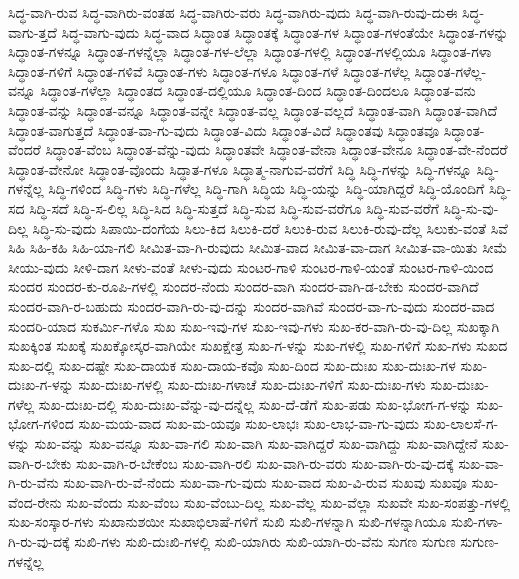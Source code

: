 {ಸಿದ್ಧ-ವಾಗಿ-ರುವ
ಸಿದ್ಧ-ವಾಗಿರು-ವಂತಹ
ಸಿದ್ಧ-ವಾಗಿರು-ವರು
ಸಿದ್ಧ-ವಾಗಿರು-ವುದು
ಸಿದ್ಧ-ವಾಗಿ-ರುವು-ದುಈ
ಸಿದ್ಧ-ವಾಗು-ತ್ತದೆ
ಸಿದ್ಧ-ವಾಗು-ವುದು
ಸಿದ್ಧ-ವಾದ
ಸಿದ್ಧಾಂತ
ಸಿದ್ಧಾಂತಕ್ಕೆ
ಸಿದ್ಧಾಂತ-ಗಳ
ಸಿದ್ಧಾಂತ-ಗಳಂತೆಯೇ
ಸಿದ್ಧಾಂತ-ಗಳನ್ನು
ಸಿದ್ಧಾಂತ-ಗಳನ್ನೂ
ಸಿದ್ಧಾಂತ-ಗಳನ್ನೆಲ್ಲಾ
ಸಿದ್ಧಾಂತ-ಗಳ-ಲೆಲ್ಲಾ
ಸಿದ್ಧಾಂತ-ಗಳಲ್ಲಿ
ಸಿದ್ಧಾಂತ-ಗಳಲ್ಲಿಯೂ
ಸಿದ್ಧಾಂತ-ಗಳಾ
ಸಿದ್ಧಾಂತ-ಗಳಿಗೆ
ಸಿದ್ಧಾಂತ-ಗಳಿವೆ
ಸಿದ್ಧಾಂತ-ಗಳು
ಸಿದ್ಧಾಂತ-ಗಳೂ
ಸಿದ್ಧಾಂತ-ಗಳೆ
ಸಿದ್ಧಾಂತ-ಗಳೆಲ್ಲ
ಸಿದ್ಧಾಂತ-ಗಳೆಲ್ಲ-ವನ್ನೂ
ಸಿದ್ಧಾಂತ-ಗಳೆಲ್ಲಾ
ಸಿದ್ಧಾಂತದ
ಸಿದ್ಧಾಂತ-ದಲ್ಲಿಯೂ
ಸಿದ್ಧಾಂತ-ದಿಂದ
ಸಿದ್ಧಾಂತ-ದಿಂದಲೂ
ಸಿದ್ಧಾಂತ-ವನು
ಸಿದ್ಧಾಂತ-ವನ್ನು
ಸಿದ್ಧಾಂತ-ವನ್ನೂ
ಸಿದ್ಧಾಂತ-ವನ್ನೇ
ಸಿದ್ಧಾಂತ-ವಲ್ಲ
ಸಿದ್ಧಾಂತ-ವಲ್ಲದೆ
ಸಿದ್ಧಾಂತ-ವಾಗಿ
ಸಿದ್ಧಾಂತ-ವಾಗಿದೆ
ಸಿದ್ಧಾಂತ-ವಾಗುತ್ತದೆ
ಸಿದ್ಧಾಂತ-ವಾ-ಗು-ವುದು
ಸಿದ್ಧಾಂತ-ವಿದು
ಸಿದ್ಧಾಂತ-ವಿದೆ
ಸಿದ್ಧಾಂತವು
ಸಿದ್ಧಾಂತವೂ
ಸಿದ್ಧಾಂತ-ವೆಂದರೆ
ಸಿದ್ಧಾಂತ-ವೆಂಬ
ಸಿದ್ಧಾಂತ-ವೆನ್ನು-ವುದು
ಸಿದ್ಧಾಂತವೇ
ಸಿದ್ಧಾಂತ-ವೇನಾ
ಸಿದ್ಧಾಂತ-ವೇನೂ
ಸಿದ್ಧಾಂತ-ವೇ-ನೆಂದರೆ
ಸಿದ್ಧಾಂತ-ವೇನೋ
ಸಿದ್ಧಾಂತ-ವೊಂದು
ಸಿದ್ಧಾತ-ಗಳೂ
ಸಿದ್ಧಾತ್ಮ-ನಾಗುವ-ವರೆಗೆ
ಸಿದ್ಧಿ
ಸಿದ್ಧಿ-ಗಳನ್ನು
ಸಿದ್ಧಿ-ಗಳನ್ನೂ
ಸಿದ್ಧಿ-ಗಳನ್ನೆಲ್ಲ
ಸಿದ್ಧಿ-ಗಳಿಂದ
ಸಿದ್ಧಿ-ಗಳು
ಸಿದ್ಧಿ-ಗಳೆಲ್ಲ
ಸಿದ್ಧಿ-ಗಾಗಿ
ಸಿದ್ಧಿಯ
ಸಿದ್ಧಿ-ಯನ್ನು
ಸಿದ್ಧಿ-ಯಾಗಿದ್ದರೆ
ಸಿದ್ಧಿ-ಯೊಂದಿಗೆ
ಸಿದ್ಧಿ-ಸದ
ಸಿದ್ಧಿ-ಸದೆ
ಸಿದ್ಧಿ-ಸ-ಲಿಲ್ಲ
ಸಿದ್ಧಿ-ಸಿದ
ಸಿದ್ಧಿ-ಸುತ್ತದೆ
ಸಿದ್ಧಿ-ಸುವ
ಸಿದ್ಧಿ-ಸುವ-ವರೆಗೂ
ಸಿದ್ಧಿ-ಸುವ-ವರೆಗೆ
ಸಿದ್ಧಿ-ಸು-ವು-ದಿಲ್ಲ
ಸಿದ್ಧಿ-ಸು-ವುದು
ಸಿಪಾಯಿ-ದಂಗೆಯ
ಸಿಲು-ಕಿದ
ಸಿಲುಕಿ-ದರೆ
ಸಿಲುಕಿ-ರುವ
ಸಿಲುಕಿ-ರುವು-ದೆಲ್ಲ
ಸಿಲುಕು-ವಂತೆ
ಸಿವೆ
ಸಿಹಿ
ಸಿಹಿ-ಕಹಿ
ಸಿಹಿ-ಯಾ-ಗಲಿ
ಸೀಮಿತ-ವಾ-ಗಿ-ರುವುದು
ಸೀಮಿತ-ವಾದ
ಸೀಮಿತ-ವಾ-ದಾಗ
ಸೀಮಿತ-ವಾ-ಯಿತು
ಸೀಮೆ
ಸೀಯು-ವುದು
ಸೀಳಿ-ದಾಗ
ಸೀಳು-ವಂತೆ
ಸೀಳು-ವುದು
ಸುಂಟರ-ಗಾಳಿ
ಸುಂಟರ-ಗಾಳಿ-ಯಂತೆ
ಸುಂಟರ-ಗಾಳಿ-ಯಿಂದ
ಸುಂದರ
ಸುಂದರ-ಕು-ರೂಪಿ-ಗಳಲ್ಲಿ
ಸುಂದರ-ನೆಂದು
ಸುಂದರ-ವಾಗಿ
ಸುಂದರ-ವಾಗಿ-ಡ-ಬೇಕು
ಸುಂದರ-ವಾಗಿದೆ
ಸುಂದರ-ವಾಗಿ-ರ-ಬಹುದು
ಸುಂದರ-ವಾಗಿ-ರು-ವು-ದನ್ನು
ಸುಂದರ-ವಾಗಿವೆ
ಸುಂದರ-ವಾ-ಗು-ವುದು
ಸುಂದರ-ವಾದ
ಸುಂದರಿ-ಯಾದ
ಸುಕರ್ಮಿ-ಗಳೊ
ಸುಖ
ಸುಖ-ಇವು-ಗಳ
ಸುಖ-ಇವು-ಗಳು
ಸುಖ-ಕರ-ವಾಗಿ-ರು-ವು-ದಿಲ್ಲ
ಸುಖಕ್ಕಾಗಿ
ಸುಖಕ್ಕಿಂತ
ಸುಖಕ್ಕೆ
ಸುಖಕ್ಕೋಸ್ಕರ-ವಾಗಿಯೇ
ಸುಖಕ್ಷೇತ್ರ
ಸುಖ-ಗ-ಳನ್ನು
ಸುಖ-ಗಳಲ್ಲಿ
ಸುಖ-ಗಳಿಗೆ
ಸುಖ-ಗಳು
ಸುಖದ
ಸುಖ-ದಲ್ಲಿ
ಸುಖ-ದಷ್ಟೇ
ಸುಖ-ದಾಯಕ
ಸುಖ-ದಾಯ-ಕವೊ
ಸುಖ-ದಿಂದ
ಸುಖ-ದುಃಖ
ಸುಖ-ದುಃಖ-ಗಳ
ಸುಖ-ದುಃಖ-ಗ-ಳನ್ನು
ಸುಖ-ದುಃಖ-ಗಳಲ್ಲಿ
ಸುಖ-ದುಃಖ-ಗಳಾಚೆ
ಸುಖ-ದುಃಖ-ಗಳಿಗೆ
ಸುಖ-ದುಃಖ-ಗಳು
ಸುಖ-ದುಃಖ-ಗಳೆಲ್ಲ
ಸುಖ-ದುಃಖ-ದಲ್ಲಿ
ಸುಖ-ದುಃಖ-ವೆನ್ನು-ವು-ದನ್ನೆಲ್ಲ
ಸುಖ-ದೆ-ಡೆಗೆ
ಸುಖ-ಪಡು
ಸುಖ-ಭೋಗ-ಗ-ಳನ್ನು
ಸುಖ-ಭೋಗ-ಗಳಿಂದ
ಸುಖ-ಮಯ-ವಾದ
ಸುಖ-ಮ-ಯವೂ
ಸುಖ-ಲಾಭಃ
ಸುಖ-ಲಾಭ-ವಾ-ಗು-ವುದು
ಸುಖ-ಲಾಲಸೆ-ಗ-ಳನ್ನು
ಸುಖ-ವನ್ನು
ಸುಖ-ವನ್ನೂ
ಸುಖ-ವಾ-ಗಲಿ
ಸುಖ-ವಾಗಿ
ಸುಖ-ವಾಗಿದ್ದರೆ
ಸುಖ-ವಾಗಿದ್ದು
ಸುಖ-ವಾಗಿದ್ದೇನೆ
ಸುಖ-ವಾಗಿ-ರ-ಬೇಕು
ಸುಖ-ವಾಗಿ-ರ-ಬೇಕೆಂಬ
ಸುಖ-ವಾಗಿ-ರಲಿ
ಸುಖ-ವಾಗಿ-ರು-ವರು
ಸುಖ-ವಾಗಿ-ರು-ವು-ದಕ್ಕೆ
ಸುಖ-ವಾ-ಗಿ-ರು-ವೆನು
ಸುಖ-ವಾಗಿ-ರು-ವೆ-ನೆಂದು
ಸುಖ-ವಾ-ಗು-ವುದು
ಸುಖ-ವಾದ
ಸುಖ-ವಿ-ರುವ
ಸುಖವು
ಸುಖವೂ
ಸುಖ-ವೆಂದ-ರೇನು
ಸುಖ-ವೆಂದು
ಸುಖ-ವೆಂಬ
ಸುಖ-ವೆಂಬು-ದಿಲ್ಲ
ಸುಖ-ವೆಲ್ಲ
ಸುಖ-ವೆಲ್ಲಾ
ಸುಖವೇ
ಸುಖ-ಸಂಪತ್ತು-ಗಳಲ್ಲಿ
ಸುಖ-ಸಂಸ್ಕಾರ-ಗಳು
ಸುಖಾನುಶಯೀ
ಸುಖಾಭಿಲಾಷೆ-ಗಳಿಗೆ
ಸುಖಿ
ಸುಖಿ-ಗಳನ್ನಾಗಿ
ಸುಖಿ-ಗಳನ್ನಾಗಿಯೂ
ಸುಖಿ-ಗಳಾ-ಗಿ-ರು-ವು-ದಕ್ಕೆ
ಸುಖಿ-ಗಳು
ಸುಖಿ-ದುಃಖಿ-ಗಳಲ್ಲಿ
ಸುಖಿ-ಯಾಗಿರು
ಸುಖಿ-ಯಾಗಿ-ರು-ವೆನು
ಸುಗಣ
ಸುಗುಣ
ಸುಗುಣ-ಗಳನ್ನೆಲ್ಲ
}
